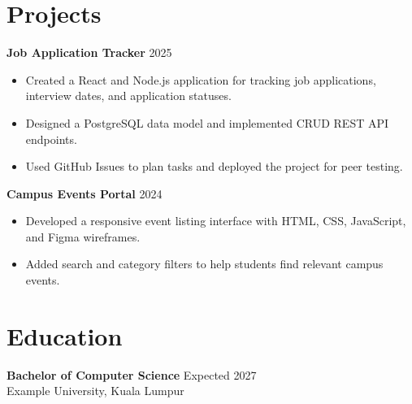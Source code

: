 \documentclass[11pt]{article}
\begin{document}
\section*{Projects}
\textbf{Job Application Tracker} \hfill 2025
\begin{itemize}[leftmargin=*,nosep]
  \item Created a React and Node.js application for tracking job applications, interview dates, and application statuses.
  \item Designed a PostgreSQL data model and implemented CRUD REST API endpoints.
  \item Used GitHub Issues to plan tasks and deployed the project for peer testing.
\end{itemize}

\textbf{Campus Events Portal} \hfill 2024
\begin{itemize}[leftmargin=*,nosep]
  \item Developed a responsive event listing interface with HTML, CSS, JavaScript, and Figma wireframes.
  \item Added search and category filters to help students find relevant campus events.
\end{itemize}

\section*{Education}
\textbf{Bachelor of Computer Science} \hfill Expected 2027\\
Example University, Kuala Lumpur
\end{document}
